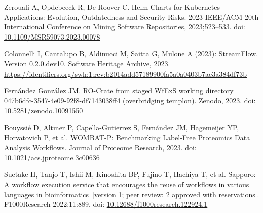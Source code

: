 \documentclass[10pt,letterpaper]{article}
\begin{document}
\begin{thebibliography}{10}
\begin{small}
Zerouali A, Opdebeeck R, De Roover C.
Helm Charts for Kubernetes Applications: Evolution, Outdatedness and Security Risks.
2023 IEEE/ACM 20th International Conference on Mining Software Repositories, 2023;523--533.
doi: \href{https://doi.org/10.1109/MSR59073.2023.00078}{10.1109/MSR59073.2023.00078}

Colonnelli I, Cantalupo B, Aldinucci M, Saitta G, Mulone A (2023):
StreamFlow. Version 0.2.0.dev10.
Software Heritage Archive, 2023.
\url{https://identifiers.org/swh:1:rev:b2014add57189900fa5a0a0403b7ae3a384df73b}

Fernández González JM.
RO-Crate from staged WfExS working directory 047b6dfc-3547-4e09-92f8-df7143038ff4 (overbridging templon).
Zenodo, 2023.
doi: \href{https://doi.org/10.5281/zenodo.10091550}{10.5281/zenodo.10091550}


Bouyssié D, Altıner P, Capella-Gutierrez S, Fernández JM, Hagemeijer YP, Horvatovich P, et al.
WOMBAT-P: Benchmarking Label-Free Proteomics Data Analysis Workflows.
Journal of Proteome Research, 2023.
doi: \href{https://doi.org/10.1021/acs.jproteome.3c00636}{10.1021/acs.jproteome.3c00636}

Suetake H, Tanjo T, Ishii M, Kinoshita BP, Fujino T, Hachiya T, et al.
Sapporo: A workflow execution service that encourages the reuse of workflows in various languages in bioinformatics~[version 1; peer review: 2 approved with reservations].
F1000Research 2022;11:889.
doi: \href{https://doi.org/10.12688/f1000research.122924.1}{10.12688/f1000research.122924.1}



\end{small}
\end{thebibliography}
\end{document}
